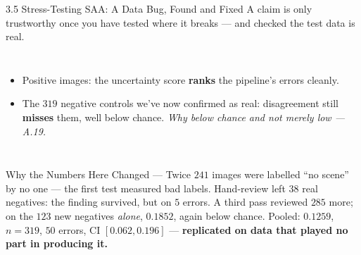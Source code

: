 \documentclass[aspectratio=169,11pt]{beamer}
\begin{document}
\begin{frame}{3.5 Stress-Testing SAA: A Data Bug, Found and Fixed}
\scriptsize
A claim is only trustworthy once you have tested where it breaks --- and checked the test data is real.
\begin{columns}[T]
\centering
{}
\begin{itemize}\scriptsize
  \item Positive images: the uncertainty score \textbf{ranks} the pipeline's errors cleanly.
  \item The $319$ negative controls we've now confirmed as real: disagreement still \textbf{misses} them, well below chance. \emph{Why below chance and not merely low --- A.19.}
\end{itemize}
\end{columns}

\vspace{-4.5mm}
\begin{alertblock}{\scriptsize Why the Numbers Here Changed --- Twice}
\scriptsize $241$ images were labelled ``no scene'' by no one --- the first test measured bad labels. Hand-review left $38$ real negatives: the finding survived, but on $5$ errors. A third pass reviewed $285$ more; on the $123$ new negatives \emph{alone}, $0.1852$, again below chance. Pooled: $\mathbf{0.1259}$, $n{=}319$, $50$ errors, CI $[0.062,0.196]$ --- \textbf{replicated on data that played no part in producing it.}
\end{alertblock}
\end{frame}
\end{document}
